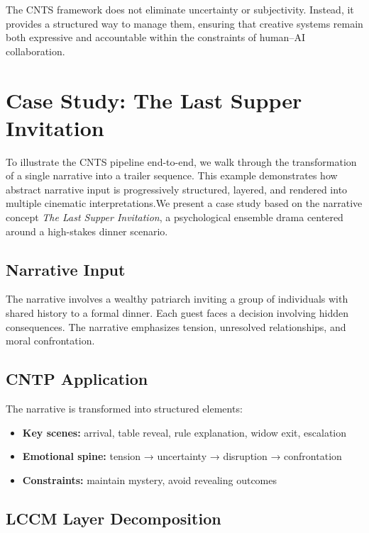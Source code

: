 \documentclass[preprints,article,submit,pdftex,moreauthors,accept]{Definitions/mdpi}
\begin{document}
The CNTS framework does not eliminate uncertainty or subjectivity. Instead, it provides a structured way to manage them, ensuring that creative systems remain both expressive and accountable within the constraints of human–AI collaboration.

\section{Case Study: The Last Supper Invitation}

To illustrate the CNTS pipeline end-to-end, we walk through the transformation of a single narrative into a trailer sequence. This example demonstrates how abstract narrative input is progressively structured, layered, and rendered into multiple cinematic interpretations.We present a case study based on the narrative concept \emph{The Last Supper Invitation}, a psychological ensemble drama centered around a high-stakes dinner scenario.

\subsection{Narrative Input}

The narrative involves a wealthy patriarch inviting a group of individuals with shared history to a formal dinner. Each guest faces a decision involving hidden consequences. The narrative emphasizes tension, unresolved relationships, and moral confrontation.

\subsection{CNTP Application}

The narrative is transformed into structured elements:

\begin{itemize}
\item \textbf{Key scenes:} arrival, table reveal, rule explanation, widow exit, escalation
\item \textbf{Emotional spine:} tension → uncertainty → disruption → confrontation
\item \textbf{Constraints:} maintain mystery, avoid revealing outcomes
\end{itemize}

\subsection{LCCM Layer Decomposition}
\end{document}
